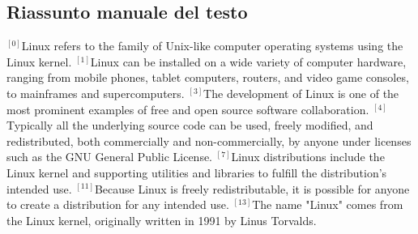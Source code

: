 \newpage
\begin{small}
\subsection*{Riassunto manuale del testo}
{$^{[0]}$}Linux refers to the family of Unix-like computer operating systems using the Linux kernel. 
{$^{[1]}$}Linux can be installed on a wide variety of computer hardware, ranging from mobile phones, tablet computers, routers, and video game consoles, to mainframes and supercomputers.
{$^{[3]}$}The development of Linux is one of the most prominent examples of free and open source software collaboration.
{$^{[4]}$}Typically all the underlying source code can be used, freely modified, and redistributed, both commercially and non-commercially, by anyone under licenses such as the GNU General Public License. 
{$^{[7]}$}Linux distributions include the Linux kernel and supporting utilities and libraries to fulfill the distribution's intended use.
{$^{[11]}$}Because Linux is freely redistributable, it is possible for anyone to create a distribution for any intended use. 
{$^{[13]}$}The name "Linux" comes from the Linux kernel, originally written in 1991 by Linus Torvalds. 
\vfill
\end{small}

